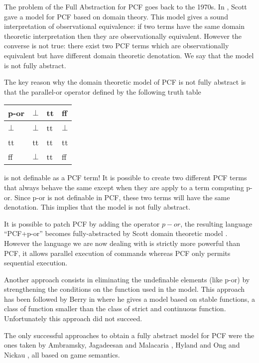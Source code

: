 The problem of the Full Abstraction for PCF goes back to the 1970s.
In \citep{scott93}, Scott gave a model for PCF based on domain
theory. This model gives a sound interpretation of observational
equivalence: if two terms have the same domain theoretic
interpretation then they are observationally equivalent. However the
converse is not true: there exist two PCF terms which are
observationally equivalent but have different domain theoretic
denotation. We say that the model is not fully abstract.

The key reason why the domain theoretic model of PCF is not fully
abstract is that the parallel-or operator defined by the following
truth table
\begin{center}
\begin{tabular}{l|lll}
p-or  & $\bot$ & tt & ff \\ \hline
$\bot$ & $\bot$ & tt & $\bot$\\
tt & tt & tt & tt\\
ff & $\bot$ & tt & ff\\
\end{tabular}
\end{center}
is not definable as a PCF term! It is possible to create two
different PCF terms that always behave the same except when they are
apply to a term computing p-or. Since p-or is not definable in PCF,
these two terms will have the same denotation. This implies that the
model is not fully abstract.


It is possible to patch PCF by adding the operator $p-or$, the
resulting language ``PCF+p-or'' becomes fully-abstracted by Scott
domain theoretic model \citep{DBLP:journals/tcs/Plotkin77}. However
the language we are now dealing with is strictly more powerful than
PCF, it allows parallel execution of commands whereas PCF only
permits sequential execution.

Another approach consists in eliminating  the undefinable elements
(like p-or) by strengthening the conditions on the function used in
the model. This approach has been followed by Berry in
\cite{berry-stable,gberry-thesis} where he gives a model based on
stable functions, a class of function smaller than the class of
strict and continuous function. Unfortunately this approach did not
succeed.

The only successful approaches to obtain a fully abstract model for
PCF were the ones taken by Ambramsky, Jagadeesan and Malacaria
\citep{abramsky94full}, Hyland and Ong \citep{hylandong_pcf} and
Nickau \citep{Nickau:lfcs94}, all based on game semantics.

